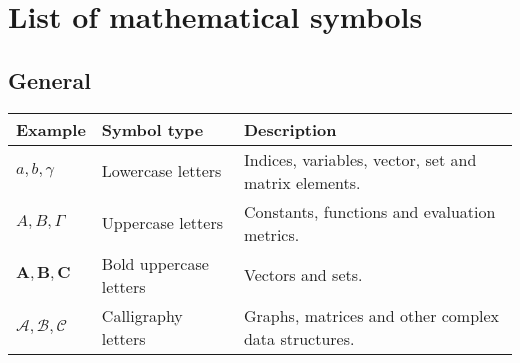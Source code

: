 \chapter[List of mathematical symbols]{List of mathematical symbols}









\section*{General}
\begin{tabular}{p{1.6cm}p{3.8cm}P{6.7cm}}
\toprule
\textbf{Example}    & \textbf{Symbol type}        & \textbf{Description} \\
\midrule
$a,b,\gamma$    & Lowercase letters  & Indices, variables, vector, set and matrix elements. \\
$A,B,\Gamma$    & Uppercase letters  & Constants, functions and evaluation metrics. \\
$\mathbf{A},\mathbf{B},\mathbf{C}$ & Bold uppercase letters & Vectors and sets. \\
$\mathcal{A},\mathcal{B},\mathcal{C}$ & Calligraphy letters & Graphs, matrices and other complex data structures. \\
\bottomrule
\end{tabular}
\vspace{0.3cm}

